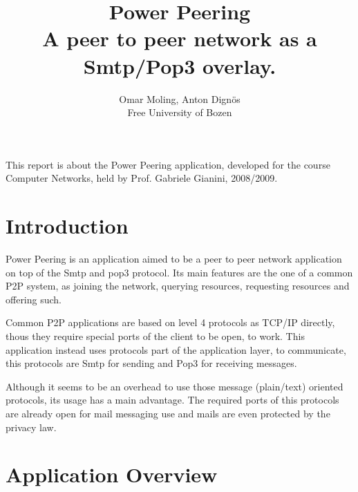\documentclass{article}
\begin{document}
\title{Power Peering \\ A peer to peer network as a Smtp/Pop3 overlay.}

\author{Omar Moling, Anton Dign\"{o}s \\ Free University of Bozen}

\date{}

\maketitle

\noindent
This report is about the Power Peering application, developed for the course
Computer Networks, held by Prof. Gabriele Gianini, 2008/2009.

\section{Introduction}

Power Peering is an application aimed to be a peer to peer network application
on top of the Smtp and pop3 protocol. Its main features are the one of a common
P2P system, as joining the network, querying resources, requesting resources
and offering such. 

Common P2P applications are based on level 4 protocols as
TCP/IP directly, thous they require special ports of the client to be open, to
work. This application instead uses protocols part of the application layer, to
communicate, this protocols are Smtp for sending and Pop3 for receiving
messages. 

Although it seems to be an overhead to use those message (plain/text)
oriented protocols, its usage has a main advantage. The required ports of this
protocols are already open for mail messaging use and mails are even protected
by the privacy law.



\section{Application Overview}
\end{document}
